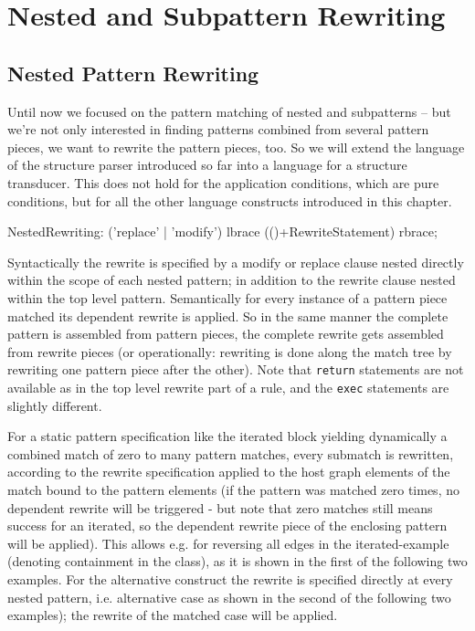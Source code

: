 \chapter{Nested and Subpattern Rewriting}


\section{Nested Pattern Rewriting}
\label{sec:nestedrewrite}

Until now we focused on the pattern matching of nested and subpatterns -- but we're not only interested in finding patterns combined from several pattern pieces, we want to rewrite the pattern pieces, too.
So we will extend the language of the structure parser introduced so far into a language for a structure transducer.
This does not hold for the application conditions, which are pure conditions, but for all the other language constructs introduced in this chapter.

\begin{rail}  
  NestedRewriting: ('replace' | 'modify') lbrace (()+RewriteStatement) rbrace;
\end{rail}

Syntactically the rewrite is specified by a modify or replace clause nested directly within the scope of each nested pattern;
in addition to the rewrite clause nested within the top level pattern.
Semantically for every instance of a pattern piece matched its dependent rewrite is applied. 
So in the same manner the complete pattern is assembled from pattern pieces, the complete rewrite gets assembled from rewrite pieces
(or operationally: rewriting is done along the match tree by rewriting one pattern piece after the other).
Note that \texttt{return} statements are not available as in the top level rewrite part of a rule, and the \texttt{exec} statements are slightly different.

For a static pattern specification like the iterated block yielding dynamically a combined match of zero to many pattern matches, every submatch is rewritten, according to the rewrite specification applied to the host graph elements of the match bound to the pattern elements
(if the pattern was matched zero times, no dependent rewrite will be triggered - but note that zero matches still means success for an iterated, so the dependent rewrite piece of the enclosing pattern will be applied).
This allows e.g. for reversing all edges in the iterated-example (denoting containment in the class), as it is shown in the first of the following two examples.
For the alternative construct the rewrite is specified directly at every nested pattern, i.e. alternative case as shown in the second of the following two examples); the rewrite of the matched case will be applied.

